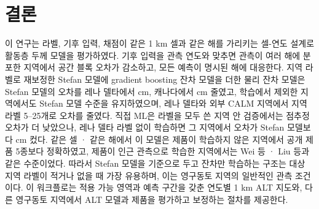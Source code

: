 \section{결론}\label{sec:conclusions}
이 연구는 라벨, 기후 입력, 채점이 같은 1 km 셀과 같은 해를 가리키는 셀-연도 설계로 활동층 두께 모델을 평가하였다. 기후 입력을 관측 연도와 맞추면 관측이 여러 해에 분포한 지역에서 공간 블록 오차가 감소하고, 모든 예측이 명시된 해에 대응한다. 지역 라벨로 재보정한 Stefan 모델에 gradient boosting 잔차 모델을 더한 물리 잔차 모델은 Stefan 모델의 오차를 레나 델타에서 \ndrefLeblkRoabs{} cm, 캐나다에서 \ndrefCablkRoabs{} cm 줄였고, 학습에서 제외한 지역에서도 Stefan 모델 수준을 유지하였으며, 레나 델타와 외부 CALM 지역에서 지역 라벨 5--25개로 오차를 줄였다. 직접 ML은 라벨을 모두 쓴 지역 안 검증에서는 점추정 오차가 더 낮았으나, 레나 델타 라벨 없이 학습하면 그 지역에서 오차가 Stefan 모델보다 \ntlLeDszeroabs{} cm 컸다. 같은 셀 · 같은 해에서 이 모델은 제품이 학습하지 않은 지역에서 공개 제품 5종보다 정확하였고, 제품이 인근 관측으로 학습한 지역에서는 Wei 등 · Liu 등과 같은 수준이었다. 따라서 Stefan 모델을 기준으로 두고 잔차만 학습하는 구조는 대상 지역 라벨이 적거나 없을 때 가장 유용하며, 이는 영구동토 지역의 일반적인 관측 조건이다. 이 워크플로는 적용 가능 영역과 예측 구간을 갖춘 연도별 1 km ALT 지도와, 다른 영구동토 지역에서 ALT 모델과 제품을 평가하고 보정하는 절차를 제공한다.

